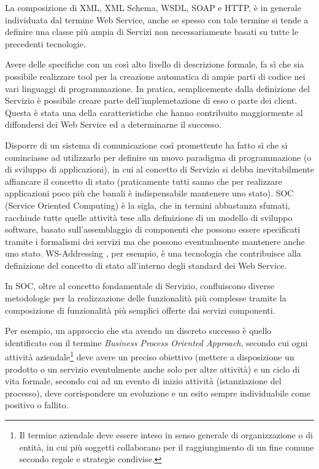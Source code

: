 La composizione di XML, XML Schema, WSDL, SOAP e HTTP, è in generale individuata
dal termine Web Service, anche se spesso con tale termine si tende a definire
una classe più ampia di Servizi non necessariamente basati su tutte le
precedenti tecnologie.

Avere delle specifiche con un così alto livello di descrizione formale, fa sì
che sia possibile realizzare tool per la creazione
automatica di ampie parti di codice nei vari linguaggi di programmazione. In
pratica, semplicemente dalla definizione del Servizio è possibile creare parte
dell'implemetazione di esso o parte dei client. Questa è stata una della
caratteristiche che hanno contribuito maggiormente al diffondersi dei Web
Service ed a determinarne il successo.

Disporre di un sistema di comunicazione così promettente ha fatto sì che si
cominciasse ad utilizzarlo per definire un nuovo paradigma di programmazione (o
di sviluppo di applicazioni), in cui al concetto di Servizio si debba
inevitabilmente affiancare il concetto di stato (praticamente tutti sanno che per
realizzare applicazioni poco più che banali è indispensabile mantenere uno
stato). SOC (Service Oriented Computing) è la sigla, che in termini abbastanza
sfumati, racchiude tutte quelle attività tese alla definizione di un modello di
sviluppo software, basato sull'assemblaggio di componenti che possono essere
specificati tramite i formalismi dei servizi ma che possono eventualmente
mantenere anche uno stato. WS-Addressing \cite{WS-Addressing}, per esempio, è
una tecnologia che contribuisce alla definizione del concetto di stato all'interno degli standard
dei Web Service.

In SOC, oltre al concetto fondamentale di Servizio, confluiscono diverse
metodologie per la realizzazione delle funzionalità più complesse tramite la
composizione di funzionalità più semplici offerte dai servizi componenti.

Per esempio, un approccio che sta avendo un discreto successo è quello
identificato con il termine \emph{Business Process Oriented Approach}, secondo
cui ogni attività aziendale\footnote{Il termine aziendale deve essere inteso in
senso generale di organizzazione o di entità, in cui più soggetti collaborano
per il raggiungimento di un fine comune secondo regole e strategie condivise.} deve
avere un preciso obiettivo (mettere a disposizione un prodotto o un servizio
eventulmente anche solo per altre attività) e un ciclo di vita formale, secondo
cui ad un evento di inizio attività (istanziazione del processo), deve
corrispondere un evoluzione e un esito sempre individuabile come positivo o
fallito.


